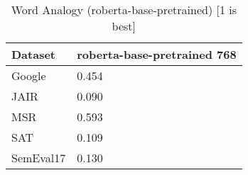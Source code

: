 \begin{table}[]
\centering
\begin{tabular}{l|l}
\hline
Dataset & roberta-base-pretrained 768 \\
\hline
Google & 0.454 \\ 
JAIR & 0.090 \\ 
MSR & 0.593 \\ 
SAT & 0.109 \\ 
SemEval17 & 0.130
\end{tabular}
\caption{Word Analogy (roberta-base-pretrained) [1 is best]}
\label{tab:analogy-roberta-base-pretrained}
\end{table}
